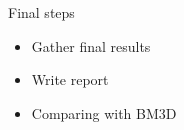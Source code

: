 \documentclass[aspectratio=169]{beamer}
\begin{document}
\begin{frame}{Final steps}
    \begin{itemize}
        \item Gather final results
        \item Write report
        \item Comparing with BM3D
    \end{itemize}
\end{frame}
\end{document}
